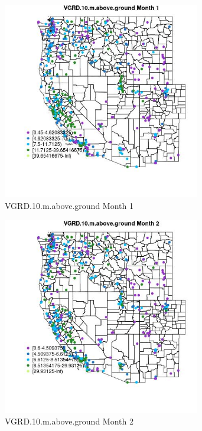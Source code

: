 \begin{figure} 
\centering  
\includegraphics[width=0.77\textwidth]{Code_Outputs/ML_input_report_ML_input_PM25_Step5_part_d_de_duplicated_aves_ML_input_MapObsMo1VGRD10maboveground.jpg} 
\caption{\label{fig:ML_input_report_ML_input_PM25_Step5_part_d_de_duplicated_aves_ML_inputMapObsMo1VGRD10maboveground}VGRD.10.m.above.ground Month 1} 
\end{figure} 
 

\begin{figure} 
\centering  
\includegraphics[width=0.77\textwidth]{Code_Outputs/ML_input_report_ML_input_PM25_Step5_part_d_de_duplicated_aves_ML_input_MapObsMo2VGRD10maboveground.jpg} 
\caption{\label{fig:ML_input_report_ML_input_PM25_Step5_part_d_de_duplicated_aves_ML_inputMapObsMo2VGRD10maboveground}VGRD.10.m.above.ground Month 2} 
\end{figure} 
 

